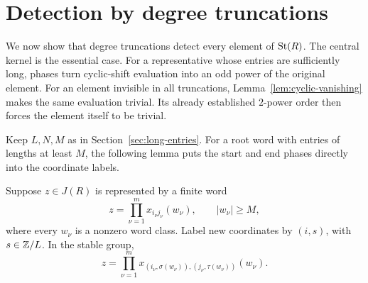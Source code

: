 \section{Detection by degree truncations}\label{sec:detection}

We now show that degree truncations detect every element of $\operatorname{St}(R)$.
The central kernel is the essential case. For a representative whose
entries are sufficiently long, phases turn cyclic-shift evaluation
into an odd power of the original element. For an element invisible
in all truncations, Lemma~\ref{lem:cyclic-vanishing} makes the same
evaluation trivial. Its already established $2$-power order then
forces the element itself to be trivial.

Keep $L,N,M$ as in Section~\ref{sec:long-entries}. For a root word
with entries of lengths at least $M$, the following lemma puts the
start and end phases directly into the coordinate labels.

\begin{lemma}\label{lem:relocation}
Suppose $z\in J(R)$ is represented by a finite word
\begin{equation}\label{eq:high-word}
 z=\prod_{\nu=1}^m x_{i_\nu j_\nu}(w_\nu),
 \qquad |w_\nu|\ge M,
\end{equation}
where every $w_\nu$ is a nonzero word class. Label new coordinates
by $(i,s)$, with $s\in\mathbb Z/L$. In the stable group,
\begin{equation}\label{eq:relocation}
 z=\prod_{\nu=1}^m
 x_{(i_\nu,\sigma(w_\nu)),(j_\nu,\tau(w_\nu))}(w_\nu).
\end{equation}
\end{lemma}

